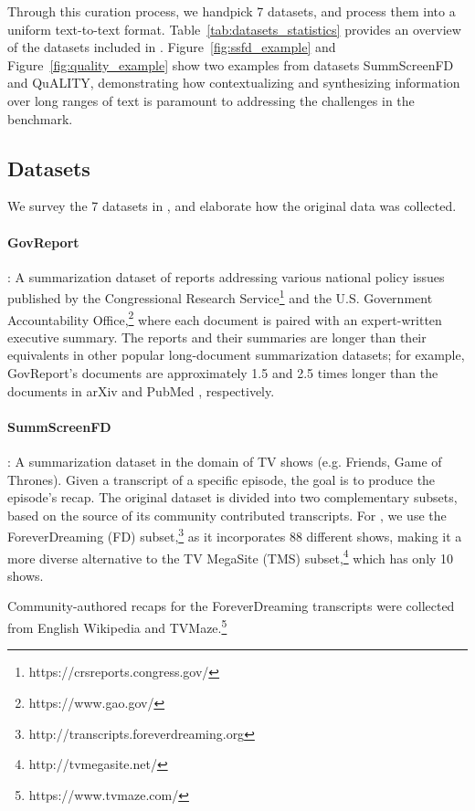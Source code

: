 Through this curation process, we handpick 7 datasets, and process them into a uniform text-to-text format.
Table~\ref{tab:datasets_statistics} provides an overview of the datasets included in \scrolls{}.
Figure~\ref{fig:ssfd_example} and Figure~\ref{fig:quality_example} show two examples from \scrolls{} datasets SummScreenFD and QuALITY, demonstrating how contextualizing and synthesizing information over long ranges of text is paramount to addressing the challenges in the benchmark.

\subsection{Datasets}

We survey the 7 datasets in \scrolls{}, and elaborate how the original data was collected.

\paragraph{GovReport} \cite{huang-etal-2021-efficient}: A summarization dataset of reports addressing various national policy issues published by the Congressional Research Service\footnote{https://crsreports.congress.gov/} and the U.S. Government Accountability Office,\footnote{https://www.gao.gov/} where each document is paired with an expert-written executive summary. The reports and their summaries are longer than their equivalents in other popular long-document summarization datasets; for example, GovReport's documents are approximately 1.5 and 2.5 times longer than the documents in arXiv and PubMed \cite{cohan-etal-2018-discourse}, respectively.

\paragraph{SummScreenFD} \cite{chen2021summscreen}: A summarization dataset in the domain of TV shows (e.g. Friends, Game of Thrones). Given a transcript of a specific episode, the goal is to produce the episode's recap. The original dataset is divided into two complementary subsets, based on the source of its community contributed transcripts. For \scrolls{}, we use the ForeverDreaming (FD) subset,\footnote{http://transcripts.foreverdreaming.org} as it incorporates 88 different shows, making it a more diverse alternative to the TV MegaSite (TMS) subset,\footnote{http://tvmegasite.net/} which has only 10 shows.

Community-authored recaps for the ForeverDreaming transcripts were collected from English Wikipedia and TVMaze.\footnote{https://www.tvmaze.com/}

